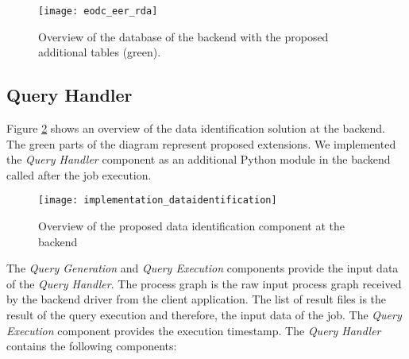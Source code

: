 \documentclass[draft,final]{vutinfth} %
\begin{document}
\begin{figure}[h]
	\centering
	\texttt{[image: eodc\_eer\_rda]}
	\caption{Overview of the database of the backend with the proposed additional tables (green).}
	\label{fig:eer_rda} %
\end{figure}

\subsection{Query Handler}
Figure \ref{fig:impldataid} shows an overview of the data identification solution at the backend. The green parts of the diagram represent proposed extensions. We implemented the \textit{Query Handler} component as an additional Python module in the backend called after the job execution. 

\begin{figure}[h]
	\centering
	\texttt{[image: implementation\_dataidentification]}
	\caption{Overview of the proposed data identification component at the backend}
	\label{fig:impldataid} %
\end{figure}

The \textit{Query Generation} and \textit{Query Execution} components provide the input data of the \textit{Query Handler}. The process graph is the raw input process graph received by the backend driver from the client application. The list of result files is the result of the query execution and therefore, the input data of the job. The \textit{Query Execution} component provides the execution timestamp. The \textit{Query Handler} contains the following components:
\end{document}
